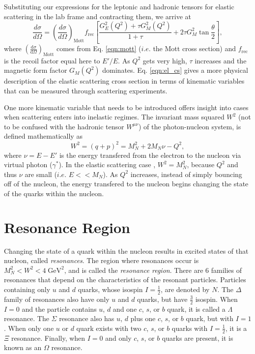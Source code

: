Substituting our expressions for the leptonic and hadronic tensors for elastic scattering in the lab frame and contracting them, we arrive at
\begin{equation}
\label{eqn:el_cs}
\frac{d\sigma}{d\Omega} = \left( \frac{d\sigma}{d\Omega} \right)_{\mathrm{Mott}} f_{\mathrm{rec}} \left[ \frac{G_E^2(Q^2) + \tau G_M^2(Q^2)}{1+\tau} + 2\tau G_M^2 \tan \frac{\theta}{2} \right],
\end{equation}
where $\left( \tfrac{\mathrm{d}\sigma}{\mathrm{d}\Omega} \right)_{\mathrm{Mott}}$ comes from Eq. \ref{eqn:mott} ($i.e.$ the Mott cross section) and $f_{\mathrm{rec}}$ is the recoil factor equal here to $E'/E$. As $Q^2$ gets very high, $\tau$ increases and the magnetic form factor $G_M(Q^2)$ dominates. Eq. \ref{eqn:el_cs} gives a more physical description of the elastic scattering cross section in terms of kinematic variables that can be measured through scattering experiments.

One more kinematic variable that needs to be introduced offers insight into cases when scattering enters into inelastic regimes. The invariant mass squared $W^2$ (not to be confused with the hadronic tensor $W^{\mu\nu}$) of the photon-nucleon system, is defined mathematically as 
\begin{equation}
W^2 = (q+p)^2 =M_N^2 + 2M_N\nu - Q^2,
\end{equation}
where $\nu = E-E'$ is the energy transfered from the electron to the nucleon via virtual photon ($\gamma^*$). In the elastic scattering case , $W^2 = M_N^2$, because $Q^2$ and thus $\nu$ are small ($i.e.$ $E << M_N$). As $Q^2$ increases, instead of simply bouncing off of the nucleon, the energy transfered to the nucleon begins changing the state of the quarks within the nucleon. 

\section{Resonance Region}
Changing the state of a quark within the nucleon results in excited states of that nucleon, called \textit{resonances}. The region where resonances occur is $M_N^2 < W^2 < 4 \; \mathrm{GeV}^2$, and is called the \textit{resonance region}. There are 6 families of resonances that depend on the characteristics of the resonant particles. Particles containing only $u$ and $d$ quarks, whose isospin $I= \tfrac{1}{2}$, are denoted by $N$. The $\Delta$ family of resonances also have only $u$ and $d$ quarks, but have $\tfrac{3}{2}$ isospin. When $I=0$ and the particle contains $u$, $d$ and one $c$, $s$, or $b$ quark, it is called a $\Lambda$ resonance. The $\Sigma$ resonance also has $u$, $d$ plus one $c$, $s$, or $b$ quark, but with $I=1$. When only one $u$ or $d$ quark exists with two $c$, $s$, or $b$ quarks with $I=\tfrac{1}{2}$, it is a $\Xi$ resonance. Finally, when $I=0$ and only $c$, $s$, or $b$ quarks are present, it is known as an $\Omega$ resonance. \cite{PDG}

